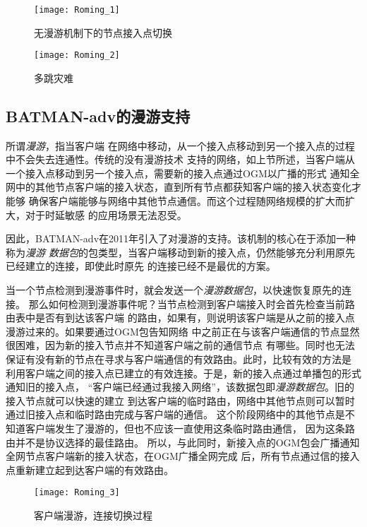 \begin{figure}[H] %
  \centering
  \texttt{[image: Roming\_1]}
  \caption{无漫游机制下的节点接入点切换}
  \label{fig:roming_1}
\end{figure}
\begin{figure}[H] %
  \centering
  \texttt{[image: Roming\_2]}
  \caption{多跳灾难}
  \label{fig:roming_2}
\end{figure}

\subsection{BATMAN-adv的漫游支持}
所谓\emph{漫游}，指当客户端
在网络中移动，从一个接入点移动到另一个接入点的过程中不会失去连通性。传统的没有漫游技术
支持的网络，如上节所述，当客户端从一个接入点移动到另一个接入点，需要新的接入点通过OGM以广播的形式
通知全网中的其他节点客户端的接入状态，直到所有节点都获知客户端的接入状态变化才能够
确保客户端能够与网络中其他节点通信。而这个过程随网络规模的扩大而扩大，对于时延敏感
的应用场景无法忍受。

因此，BATMAN-adv在2011年引入了对漫游的支持。该机制的核心在于添加一种称为\emph{漫游
数据包}的包类型，当客户端移动到新的接入点，仍然能够充分利用原先已经建立的连接，即使此时原先
的连接已经不是最优的方案。

当一个节点检测到漫游事件时，就会发送一个\emph{漫游数据包}，以快速恢复原先的连接。
那么如何检测到漫游事件呢？当节点检测到客户端接入时会首先检查当前路由表中是否有到达该客户端
的路由，如果有，则说明该客户端是从之前的接入点漫游过来的。如果要通过OGM包告知网络
中之前正在与该客户端通信的节点显然很困难，因为新的接入节点并不知道客户端之前的通信节点
有哪些。同时也无法保证有没有新的节点在寻求与客户端通信的有效路由。此时，比较有效的方法是
利用客户端之间的接入点已建立的有效连接。于是，新的接入点通过单播包的形式通知旧的接入点，
“客户端已经通过我接入网络”，该数据包即\emph{漫游数据包}。旧的接入节点就可以快速的建立
到达客户端的临时路由，网络中其他节点则可以暂时通过旧接入点和临时路由完成与客户端的通信。
这个阶段网络中的其他节点是不知道客户端发生了漫游的，但也不应该一直使用这条临时路由通信，
因为这条路由并不是协议选择的最佳路由。
所以，与此同时，新接入点的OGM包会广播通知全网节点客户端新的接入状态，在OGM广播全网完成
后，所有节点通过信的接入点重新建立起到达客户端的有效路由。

\begin{figure}[H] %
  \centering
  \texttt{[image: Roming\_3]}
  \caption{客户端漫游，连接切换过程}
  \label{fig:roming_3}
\end{figure}

